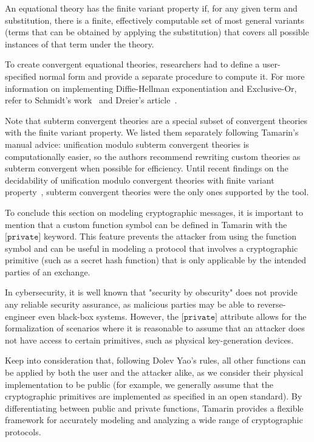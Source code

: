 \begin{definition}
    An equational theory has the finite variant property if, for any given term and substitution, there is a finite, effectively computable set of most general variants (terms that can be obtained by applying the substitution) that covers all possible instances of that term under the theory.
\end{definition}

To create convergent equational theories, researchers had to define a user-specified normal form and provide a separate procedure to compute it. For more information on implementing Diffie-Hellman exponentiation and Exclusive-Or, refer to Schmidt's work~\cite{schmidtThesis} and Dreier's article~\cite{xorCompleteness}.

Note that subterm convergent theories are a special subset of convergent theories with the finite variant property. We listed them separately following Tamarin's manual advice: unification modulo subterm convergent theories is computationally easier, so the authors recommend rewriting custom theories as subterm convergent when possible for efficiency. Until recent findings on the decidability of unification modulo convergent theories with finite variant property~\cite{Dreier_2017}, subterm convergent theories were the only ones supported by the tool.

To conclude this section on modeling cryptographic messages, it is important to mention that a custom function symbol can be defined in Tamarin with the $\texttt{[private]}$ keyword. This feature prevents the attacker from using the function symbol and can be useful in modeling a protocol that involves a cryptographic primitive (such as a secret hash function) that is only applicable by the intended parties of an exchange.

In cybersecurity, it is well known that "security by obscurity" does not provide any reliable security assurance, as malicious parties may be able to reverse-engineer even black-box systems. However, the $\texttt{[private]}$ attribute allows for the formalization of scenarios where it is reasonable to assume that an attacker does not have access to certain primitives, such as physical key-generation devices.

Keep into consideration that, following Dolev Yao's rules, all other functions can be applied by both the user and the attacker alike, as we consider their physical implementation to be public (for example, we generally assume that the cryptographic primitives are implemented as specified in an open standard). By differentiating between public and private functions, Tamarin provides a flexible framework for accurately modeling and analyzing a wide range of cryptographic protocols.

